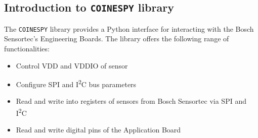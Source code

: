\documentclass{article}
\begin{document}
\subsection{Introduction to \texttt{COINESPY} library}

The \texttt{COINESPY} library provides a Python interface for interacting with the Bosch Sensortec's Engineering Boards. 
\newline \newline The library offers the following range of functionalities:
\begin{itemize}
	\item Control VDD and VDDIO of sensor
	\item Configure SPI and I\textsuperscript{2}C bus parameters
	\item Read and write into registers of sensors from Bosch Sensortec via SPI and I\textsuperscript{2}C
	\item Read and write digital pins of the Application Board
\end{itemize}
\end{document}
